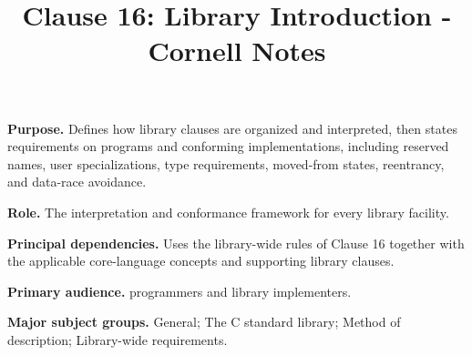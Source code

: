 \documentclass[11pt,letterpaper]{article}
\title{Clause 16: Library Introduction - Cornell Notes}
\author{}
\date{}
\begin{document}
\maketitle
\begin{CornellReferenceOrientationBox}
\textbf{Purpose.} Defines how library clauses are organized and interpreted, then states requirements on programs and conforming implementations, including reserved names, user specializations, type requirements, moved-from states, reentrancy, and data-race avoidance.
\par\textbf{Role.} The interpretation and conformance framework for every library facility.
\par\textbf{Principal dependencies.} Uses the library-wide rules of Clause 16 together with the applicable core-language concepts and supporting library clauses.
\par\textbf{Primary audience.} programmers and library implementers.
\par\textbf{Major subject groups.} General; The C standard library; Method of description; Library-wide requirements.
\end{CornellReferenceOrientationBox}
\end{document}
